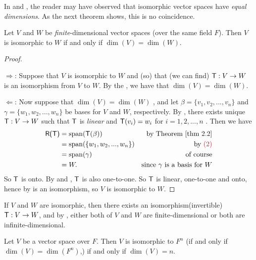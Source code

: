 In  and , the reader may have observed that isomorphic vector spaces have \emph{equal dimensions}.
As the next theorem shows, this is no coincidence.

\begin{theorem} \label{thm 2.19}
Let \(V\) and \(W\) be \emph{finite}-dimensional vector spaces (over the same field \(F\)).
Then \(V\) is isomorphic to \(W\) if and only if \(\dim(V) = \dim(W)\).
\end{theorem}

\begin{proof} \ 

\(\Longrightarrow\): Suppose that \(V\) is isomorphic to \(W\) and (so) that (we can find) \(\textsf{T}: V \to W\) is an isomorphism from \(V\) to \(W\).
By the , we have that \(\dim(V) = \dim(W)\).

\(\Longleftarrow\): Now suppose that \(\dim(V) = \dim(W)\) , and let \(\beta = \{ v_1, v_2, ..., v_n \}\) and \(\gamma = \{ w_1, w_2, ..., w_n \}\) be bases for \(V\) and \(W\), respectively.
By , there exists unique \(\textsf{T} : V \to W\) such that \(\textsf{T}\) is \emph{linear} and \(\textsf{T}(v_i) = w_i\) for \(i = 1, 2, ..., n\) .
Then we have
\begin{align*}
    \RANGET & = \spann(\T(\beta)) & \text{by \THM{2.2}} \\
            & = \spann(\{ w_1, w_2, ..., w_n \}) & \text{by \MAROON{(2)}} \\
            & = \spann(\gamma) & \text{of course} \\
            & = W. & \text{since \(\gamma\) is a basis for \(W\)}
\end{align*}
So \(\textsf{T}\) is onto.
By  and , \(\textsf{T}\) is also one-to-one.
So \(\textsf{T}\) is linear, one-to-one and onto, hence by  is an isomorphism, so \(V\) is isomorphic to \(W\).
\end{proof}

\begin{remark} \label{remark 2.4.4}
If \(V\) and \(W\) are isomorphic, then there exists an isomorphism(invertible) \(\textsf{T} : V \to W\),
and by , either both of \(V\) and \(W\) are finite-dimensional or both are infinite-dimensional.
\end{remark}

\begin{corollary} \label{corollary 2.19.1}
Let \(V\) be a vector space over \(F\).
Then \(V\) is isomorphic to \(F^n\) (if and only if \(\dim(V) = \dim(F^n)\),) if and only if \(\dim(V) = n\).
\end{corollary}

